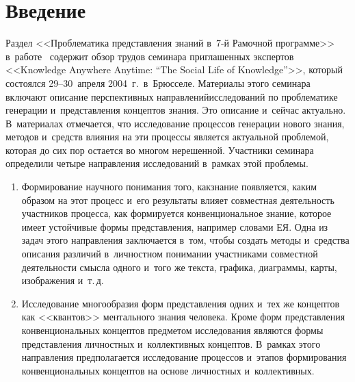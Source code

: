 
  
\vspace*{6pt}



\thispagestyle{headings}

\begin{multicols}{2}

\label{st\stat}
   
\section{Введение}

  Раздел <<Проблематика представления знаний в~7-й Рамочной программе>> 
в~работе~\cite{1-zac} содержит обзор трудов семинара приглашенных 
экспертов <<Knowledge Anywhere Anytime: ``The Social Life of Knowledge''>>, 
который состоялся 29--30~апреля 2004~г.\ в~Брюсселе. Материалы этого 
семинара включают описание перспективных направлений\linebreak исследований по 
проблематике генерации и~представления концептов знания. Это описание 
и~сейчас актуально. В~материалах отмечается, что исследование процессов 
генерации нового знания, \mbox{методов} и~средств влияния на эти процессы является 
актуальной проблемой, которая до сих пор остается во многом нерешенной. 
Участники семинара определили четыре направления исследований в~рамках 
этой проблемы.
  \begin{enumerate}[1.]
  \item  Формирование научного понимания того, как\linebreak знание появляется, каким 
образом на этот процесс и~его результаты влияет совместная деятельность 
участников процесса, как формируется конвенциональное знание, которое 
\mbox{имеет} устойчивые формы представления, например словами 
ЕЯ. Одна из задач этого направления заключается в~том, чтобы создать 
методы и~средства описания различий в~личностном понимании участниками 
совместной деятельности смысла одного и~того же текста, графика, диаграммы, 
карты, изображения и~т.\,д.
  \item  Исследование многообразия форм представления одних и~тех же 
концептов как <<квантов>> ментального знания человека. Кроме форм 
представления конвенциональных кон\-цеп\-тов пред\-ме\-том исследования 
являются формы представления личностных и~коллективных концептов. 
В~рамках этого направления предполагается исследование процессов и~этапов 
формирования конвенциональных концептов на основе личностных 
и~коллективных.




\end{enumerate}
\end{multicols}
